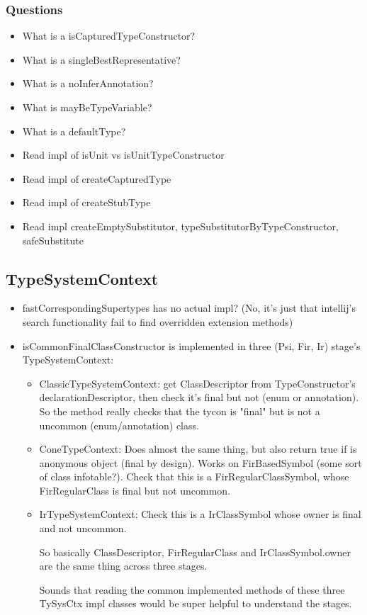\documentclass{article}
\begin{document}
\subsubsection{Questions}
\begin{itemize}
    \item What is a isCapturedTypeConstructor?
    \item What is a singleBestRepresentative?
    \item What is a noInferAnnotation?
    \item What is mayBeTypeVariable?
    \item What is a defaultType?
    \item Read impl of isUnit vs isUnitTypeConstructor
    \item Read impl of createCapturedType
    \item Read impl of createStubType
    \item Read impl createEmptySubstitutor, typeSubstitutorByTypeConstructor, safeSubstitute
\end{itemize}

\subsection{TypeSystemContext}

\begin{itemize}
    \item fastCorrespondingSupertypes has no actual impl? (No, it's just that intellij's search functionality fail to find overridden extension methods)
    \item isCommonFinalClassConstructor is implemented in three (Psi, Fir, Ir) stage's TypeSystemContext:
    \begin{itemize}
        \item ClassicTypeSystemContext: get ClassDescriptor from TypeConstructor's declarationDescriptor, then check it's final but not (enum or annotation). So the method really checks that the tycon is "final" but is not a uncommon (enum/annotation) class.
        \item ConeTypeContext: Does almost the same thing, but also return true if is anonymous object (final by design). Works on FirBasedSymbol (some sort of class infotable?). Check that this is a FirRegularClassSymbol, whose FirRegularClass is final but not uncommon.
        \item IrTypeSystemContext: Check this is a IrClassSymbol whose owner is final and not uncommon.

        So basically ClassDescriptor, FirRegularClass and IrClassSymbol.owner are the same thing across three stages.

        Sounds that reading the common implemented methods of these three TySysCtx impl classes would be super helpful to understand the stages.
    \end{itemize}
\end{itemize}
\end{document}
